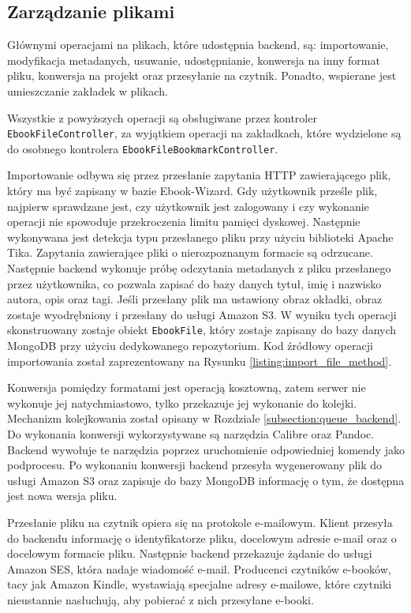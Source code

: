 \subsection{Zarządzanie plikami}

Głównymi operacjami na plikach, które udostępnia backend, są: importowanie, modyfikacja metadanych, usuwanie, udostępnianie, konwersja na inny format pliku, konwersja na projekt oraz przesyłanie na czytnik. Ponadto, wspierane jest umieszczanie zakładek w plikach.

Wszystkie z powyższych operacji są obsługiwane przez kontroler \verb|EbookFileController|, za wyjątkiem operacji na zakładkach, które wydzielone są do osobnego kontrolera \verb|EbookFileBookmarkController|.

Importowanie odbywa się przez przesłanie zapytania HTTP zawierającego plik, który ma być zapisany w bazie Ebook-Wizard. Gdy użytkownik prześle plik, najpierw sprawdzane jest, czy użytkownik jest zalogowany i czy wykonanie operacji nie spowoduje przekroczenia limitu pamięci dyskowej. Następnie wykonywana jest detekcja typu przesłanego pliku przy użyciu biblioteki Apache Tika. Zapytania zawierające pliki o nierozpoznanym formacie są odrzucane. Następnie backend wykonuje próbę odczytania metadanych z pliku przesłanego przez użytkownika, co pozwala zapisać do bazy danych tytuł, imię i nazwisko autora, opis oraz tagi. Jeśli przesłany plik ma ustawiony obraz okładki, obraz zostaje wyodrębniony i przesłany do usługi Amazon S3. W wyniku tych operacji skonstruowany zostaje obiekt \verb|EbookFile|, który zostaje zapisany do bazy danych MongoDB przy użyciu dedykowanego repozytorium. Kod źródłowy operacji importowania został zaprezentowany na Rysunku \ref{listing:import_file_method}.

Konwersja pomiędzy formatami jest operacją kosztowną, zatem serwer nie wykonuje jej natychmiastowo, tylko przekazuje jej wykonanie do kolejki. Mechanizm kolejkowania został opisany w Rozdziale \ref{subsection:queue_backend}. Do wykonania konwersji wykorzystywane są narzędzia Calibre oraz Pandoc. Backend wywołuje te narzędzia poprzez uruchomienie odpowiedniej komendy jako podprocesu. Po wykonaniu konwersji backend przesyła wygenerowany plik do usługi Amazon S3 oraz zapisuje do bazy MongoDB informację o tym, że dostępna jest nowa wersja pliku.

Przesłanie pliku na czytnik opiera się na protokole e-mailowym. Klient przesyła do backendu informację o identyfikatorze pliku, docelowym adresie e-mail oraz o docelowym formacie pliku. Następnie backend przekazuje żądanie do usługi Amazon SES, która nadaje wiadomość e-mail. Producenci czytników e-booków, tacy jak Amazon Kindle, wystawiają specjalne adresy e-mailowe, które czytniki nieustannie nasłuchują, aby pobierać z nich przesyłane e-booki.

